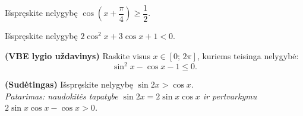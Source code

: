 \begin{exercise}
Išspręskite nelygybę $\cos\!\left(x + \dfrac{\pi}{4}\right) \geq \dfrac{1}{2}$.
\end{exercise}

\begin{exercise}
Išspręskite nelygybę $2\cos^2 x + 3\cos x + 1 < 0$.
\end{exercise}

\begin{exercise}
\textbf{(VBE lygio uždavinys)} Raskite visus $x \in [0;\, 2\pi]$, kuriems teisinga nelygybė:
\[
\sin^2 x - \cos x - 1 \leq 0.
\]
\end{exercise}

\begin{exercise}
\textbf{(Sudėtingas)} Išspręskite nelygybę $\sin 2x > \cos x$.\\
\textit{Patarimas: naudokitės tapatybe $\sin 2x = 2\sin x \cos x$ ir pertvarkymu $2\sin x \cos x - \cos x > 0$.}
\end{exercise}

